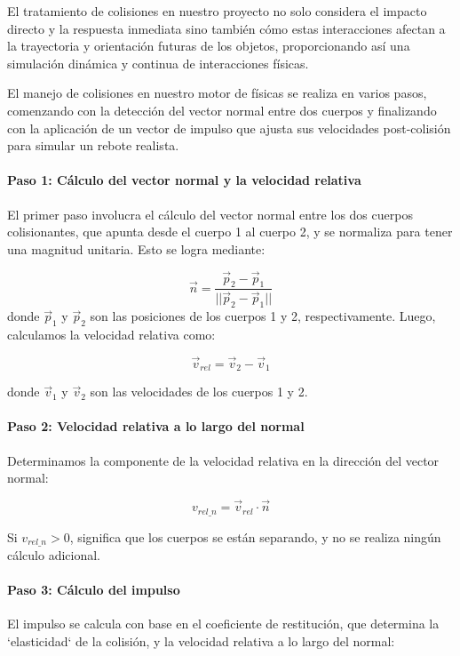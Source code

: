 El tratamiento de colisiones en nuestro proyecto no solo considera el impacto directo y la respuesta inmediata sino también cómo estas interacciones afectan a la trayectoria y orientación futuras de los objetos, proporcionando así una simulación dinámica y continua de interacciones físicas.

El manejo de colisiones en nuestro motor de físicas se realiza en varios pasos, comenzando con la detección del vector normal entre dos cuerpos y finalizando con la aplicación de un vector de impulso que ajusta sus velocidades post-colisión para simular un rebote realista.

\paragraph{Paso 1: Cálculo del vector normal y la velocidad relativa}
El primer paso involucra el cálculo del vector normal entre los dos cuerpos colisionantes, que apunta desde el cuerpo 1 al cuerpo 2, y se normaliza para tener una magnitud unitaria. Esto se logra mediante:

\begin{equation}
\label{eq4}
    \vec{n} = \frac{\vec{p}_2 - \vec{p}_1}{||\vec{p}_2 - \vec{p}_1||}
\end{equation}
donde \(\vec{p}_1\) y \(\vec{p}_2\) son las posiciones de los cuerpos 1 y 2, respectivamente. Luego, calculamos la velocidad relativa como:


\begin{equation}
\label{eq5}
    \vec{v}_{rel} = \vec{v}_2 - \vec{v}_1
\end{equation}

donde \(\vec{v}_1\) y \(\vec{v}_2\) son las velocidades de los cuerpos 1 y 2.

\paragraph{Paso 2: Velocidad relativa a lo largo del normal}
Determinamos la componente de la velocidad relativa en la dirección del vector normal:

\begin{equation}
\label{eq6}
    v_{rel\_n} = \vec{v}_{rel} \cdot \vec{n}
\end{equation}

Si \(v_{rel\_n} > 0\), significa que los cuerpos se están separando, y no se realiza ningún cálculo adicional.

\paragraph{Paso 3: Cálculo del impulso}
El impulso se calcula con base en el coeficiente de restitución, que determina la `elasticidad` de la colisión, y la velocidad relativa a lo largo del normal:

